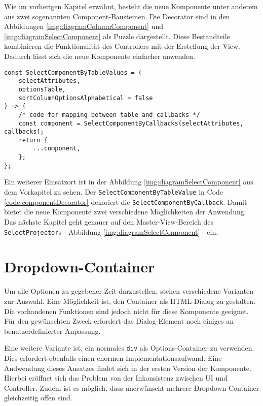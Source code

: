 Wie im vorherigen Kapitel erwähnt, besteht die neue Komponente unter anderem aus zwei sogenannten Component-Bausteinen.
Die Decorator sind in den Abbildungen \ref{img:diagramColumnComponent} und \ref{img:diagramSelectComponent} als Puzzle dargestellt.
Diese Bestandteile kombinieren die Funktionalität des Controllers mit der Erstellung der View.
Dadurch lässt sich die neue Komponente einfacher anwenden.

\begin{lstlisting}[style = htmlcssjs, caption = \texttt{SelectComponentByTableValue} dekoriert \texttt{SelectComponentByCallback}, label = code:componentDecorator]
const SelectComponentByTableValues = (
    selectAttributes,
    optionsTable,
    sortColumnOptionsAlphabetical = false
) => {
    /* code for mapping between table and callbacks */
    const component = SelectComponentByCallbacks(selectAttributes, callbacks);
    return {
        ...component,
    };
};
\end{lstlisting}

Ein weiterer Einsatzort ist in der Abbildung \ref{img:diagramSelectComponent} aus dem Vorkapitel zu sehen. 
Der \texttt{SelectComponentByTableValue} in Code \ref{code:componentDecorator} dekoriert die \texttt{SelectComponentByCallback}.
Damit bietet die neue Komponente zwei verschiedene Möglichkeiten der Anwendung.
Das nächste Kapitel geht genauer auf den Master-View-Bereich des \texttt{SelectProjector}s - Abbildung \ref{img:diagramSelectComponent} - ein. 


\section{Dropdown-Container}
\label{sec:dropdownContainer}

Um alle Optionen zu gegebener Zeit darzustellen, stehen verschiedene Varianten zur Auswahl.
Eine Möglichkeit ist, den Container als HTML-Dialog zu gestalten.
Die vorhandenen Funktionen sind jedoch nicht für diese Komponente geeignet.
Für den gewünschten Zweck erfordert das Dialog-Element noch einiges an benutzerdefinierter Anpassung.

Eine weitere Variante ist, ein normales \texttt{div} als Options-Container zu verwenden.
Dies erfordert ebenfalls einen enormen Implementationsaufwand.
Eine Andwendung dieses Ansatzes findet sich in der ersten Version der Komponente.
Hierbei eröffnet sich das Problem von der Inkonsistenz zwischen UI und Controller.
Zudem ist es möglich, dass unerwünscht mehrere Dropdown-Container gleichzeitig offen sind.


